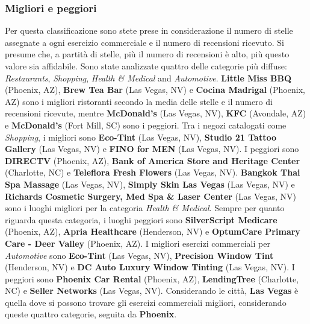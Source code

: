 \documentclass[12pt]{article}
\begin{document}
\subsubsection{Migliori e peggiori}
Per questa classificazione sono stete prese in considerazione il numero di stelle assegnate a ogni esercizio commerciale e il numero di recensioni ricevuto. Si presume che, a partità di stelle, più il numero di recensioni è alto, più questo valore sia affidabile. \newline
Sono state analizzate quattro delle categorie più diffuse: \textit{Restaurants}, \textit{Shopping}, \textit{Health \& Medical} and \textit{Automotive}.\newline
\textbf{Little Miss BBQ} (Phoenix, AZ), \textbf{Brew Tea Bar} (Las Vegas, NV) e \textbf{Cocina Madrigal} (Phoenix, AZ) sono i migliori ristoranti secondo la media delle stelle e il numero di recensioni ricevute, mentre \textbf{McDonald's} (Las Vegas, NV), \textbf{KFC} (Avondale, AZ) e \textbf{McDonald's} (Fort Mill, SC) sono i peggiori.\newline
Tra i negozi catalogati come \textit{Shopping}, i migliori sono \textbf{Eco-Tint} (Las Vegas, NV), \textbf{Studio 21 Tattoo Gallery} (Las Vegas, NV) e \textbf{FINO for MEN} (Las Vegas, NV). I peggiori sono \textbf{DIRECTV} (Phoenix, AZ), \textbf{Bank of America Store and Heritage Center} (Charlotte, NC) e \textbf{Teleflora Fresh Flowers} (Las Vegas, NV). \newline
\textbf{Bangkok Thai Spa Massage} (Las Vegas, NV), \textbf{Simply Skin Las Vegas} (Las Vegas, NV) e \textbf{Richards Cosmetic Surgery, Med Spa \& Laser Center} (Las Vegas, NV) sono i luoghi migliori per la categoria \textit{Health \& Medical}. Sempre per quanto riguarda questa categoria, i luoghi peggiori sono \textbf{SilverScript Medicare} (Phoenix, AZ), \textbf{Apria Healthcare} (Henderson, NV) e \textbf{OptumCare Primary Care - Deer Valley} (Phoenix, AZ).\newline
I migliori esercizi commerciali per \textit{Automotive} sono \textbf{Eco-Tint} (Las Vegas, NV), \textbf{Precision Window Tint} (Henderson, NV) e \textbf{DC Auto Luxury Window Tinting} (Las Vegas, NV). I peggiori sono \textbf{Phoenix Car Rental} (Phoenix, AZ), \textbf{LendingTree} (Charlotte, NC) e \textbf{Seller Networks} (Las Vegas, NV).\newline
Considerando le città, \textbf{Las Vegas} è quella dove si possono trovare gli esercizi commerciali migliori, considerando queste quattro categorie, seguita da \textbf{Phoenix}.
\end{document}

